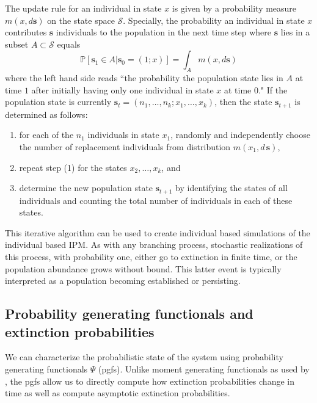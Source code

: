 \documentclass[12pt]{amsart}\usepackage[]{graphicx}\usepackage[]{color}
\def\P{\mathbb P}
\def\S{\mathcal S}
\def\s{\mathbf s}
\begin{document}
The update rule for an individual in state $x$ is given by a probability measure $m(x,d\s)$ on the state space $\S$. Specially, the probability an individual in state $x$ contributes $\s$ individuals to the population in the next time step where $\s$ lies in a subset $A\subset \S$ equals
\[
\P[\s_1\in A| \s_0 =(1;x)]=\int_A m(x,d\s)
\]
where the left hand side reads ``the probability the population state lies in $A$ at time $1$ after initially having only one individual in state $x$ at time $0$." If the population state is currently $\s_t=(n_1,\dots,n_k;x_1,\dots,x_k)$, then the state $\s_{t+1}$ is determined as follows:
\begin{enumerate}
\item for each of the $n_1$ individuals in state $x_1$, randomly and independently choose the number of replacement individuals from distribution $m(x_1,d\,\s)$,
\item repeat step (1) for the states $x_2,\dots, x_k$, and
\item determine the new population state $\s_{t+1}$ by identifying the states of all individuals and counting the total number of individuals in each of these states.
\end{enumerate}
This iterative algorithm can be used to create individual based simulations of the individual based IPM. As with any branching process, stochastic realizations of this process, with probability one, either go to extinction in finite time, or the population abundance grows without bound. This latter event is typically interpreted as a population becoming established or persisting.

\subsection*{Probability generating functionals and extinction probabilities}

We can characterize the probabilistic state of the system using probability generating functionals $\Psi$ (pgfs). Unlike moment generating functionals as used by \citet{harris-63}, the pgfs allow us to directly compute how extinction probabilities change in time as well as compute asymptotic extinction probabilities.
\end{document}
